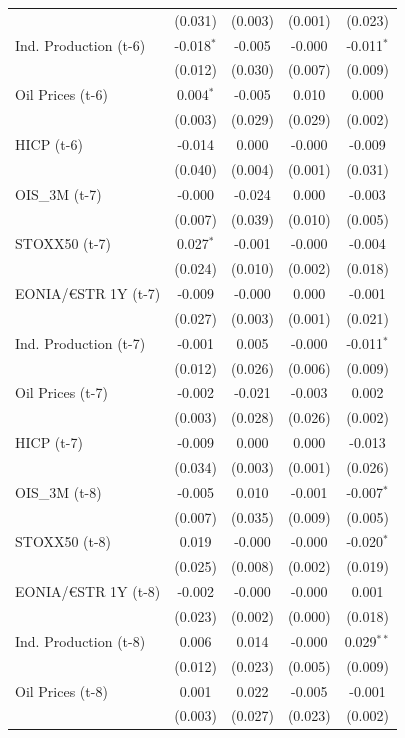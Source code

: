 \begin{longtable}[t]{lcccc}
 & (0.031) & (0.003) & (0.001) & (0.023)\\
Ind. Production (t-6) & -0.018$^{*}$ & -0.005 & -0.000 & -0.011$^{*}$\\
 & (0.012) & (0.030) & (0.007) & (0.009)\\
Oil Prices (t-6) & 0.004$^{*}$ & -0.005 & 0.010 & 0.000\\
 & (0.003) & (0.029) & (0.029) & (0.002)\\
HICP (t-6) & -0.014 & 0.000 & -0.000 & -0.009\\
 & (0.040) & (0.004) & (0.001) & (0.031)\\
OIS\_3M (t-7) & -0.000 & -0.024 & 0.000 & -0.003\\
 & (0.007) & (0.039) & (0.010) & (0.005)\\
STOXX50 (t-7) & 0.027$^{*}$ & -0.001 & -0.000 & -0.004\\
 & (0.024) & (0.010) & (0.002) & (0.018)\\
EONIA/€STR 1Y (t-7) & -0.009 & -0.000 & 0.000 & -0.001\\
 & (0.027) & (0.003) & (0.001) & \vphantom{1} (0.021)\\
Ind. Production (t-7) & -0.001 & 0.005 & -0.000 & -0.011$^{*}$\\
 & (0.012) & (0.026) & (0.006) & (0.009)\\
Oil Prices (t-7) & -0.002 & -0.021 & -0.003 & 0.002\\
 & (0.003) & (0.028) & (0.026) & (0.002)\\
HICP (t-7) & -0.009 & 0.000 & 0.000 & -0.013\\
 & (0.034) & (0.003) & (0.001) & (0.026)\\
OIS\_3M (t-8) & -0.005 & 0.010 & -0.001 & -0.007$^{*}$\\
 & (0.007) & (0.035) & (0.009) & (0.005)\\
STOXX50 (t-8) & 0.019 & -0.000 & -0.000 & -0.020$^{*}$\\
 & (0.025) & (0.008) & (0.002) & (0.019)\\
EONIA/€STR 1Y (t-8) & -0.002 & -0.000 & -0.000 & 0.001\\
 & (0.023) & (0.002) & (0.000) & (0.018)\\
Ind. Production (t-8) & 0.006 & 0.014 & -0.000 & 0.029$^{**}$\\
 & (0.012) & (0.023) & (0.005) & (0.009)\\
Oil Prices (t-8) & 0.001 & 0.022 & -0.005 & -0.001\\
 & (0.003) & (0.027) & (0.023) & (0.002)\\

\end{longtable}
